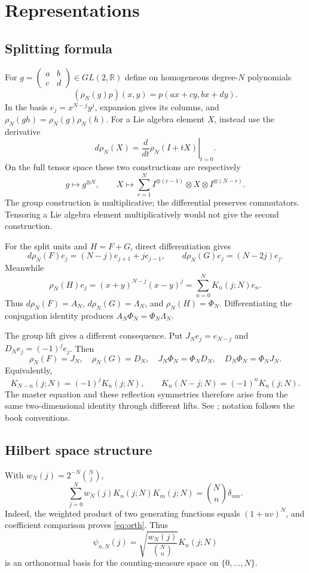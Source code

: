 \chapter{Representations}
\label{ch:8}
\section{Splitting formula}
\label{sec:8-1}
For $g=\begin{pmatrix}a&b\\c&d\end{pmatrix}\in GL(2,\mathbb R)$ define
on homogeneous degree-$N$ polynomials
\[
(\rho_N(g)p)(x,y)=p(ax+cy,bx+dy).
\]
In the basis $e_j=x^{N-j}y^j$, expansion gives its columns, and
$\rho_N(gh)=\rho_N(g)\rho_N(h)$.
For a Lie algebra element $X$, instead use the derivative
\[
d\rho_N(X)=\left.\frac{d}{dt}\rho_N(I+tX)\right|_{t=0}.
\]
On the full tensor space these two constructions are respectively
\[
g\mapsto g^{\otimes N},\qquad
X\mapsto\sum_{r=1}^N I^{\otimes(r-1)}\otimes X\otimes I^{\otimes(N-r)}.
\]
The group construction is multiplicative; the differential preserves
commutators. Tensoring a Lie algebra element multiplicatively would
not give the second construction.

For the split units and $H=F+G$, direct differentiation gives
\[
d\rho_N(F)e_j=(N-j)e_{j+1}+je_{j-1},\qquad
d\rho_N(G)e_j=(N-2j)e_j.
\]
Meanwhile
\[
\rho_N(H)e_j=(x+y)^{N-j}(x-y)^j
=\sum_{n=0}^N K_n(j;N)e_n.
\]
Thus $d\rho_N(F)=A_N$, $d\rho_N(G)=\Lambda_N$, and
$\rho_N(H)=\Phi_N$. Differentiating the conjugation identity produces
$A_N\Phi_N=\Phi_N\Lambda_N$.

The group lift gives a different consequence. Put
$J_Ne_j=e_{N-j}$ and $D_Ne_j=(-1)^je_j$. Then
\[
\rho_N(F)=J_N,\quad\rho_N(G)=D_N,\quad
J_N\Phi_N=\Phi_ND_N,\quad D_N\Phi_N=\Phi_NJ_N.
\]
Equivalently,
\[
K_{N-n}(j;N)=(-1)^jK_n(j;N),\qquad
K_n(N-j;N)=(-1)^nK_n(j;N).
\]
The master equation and these reflection symmetries therefore arise
from the same two-dimensional identity through different lifts.
See \cite[Section~7]{KocikFeynman}; notation follows the book conventions.

\section{Hilbert space structure}
\label{sec:8-2}
With $w_N(j)=2^{-N}\binom Nj$,
\begin{equation}\label{eq:orth}
\sum_{j=0}^Nw_N(j)K_n(j;N)K_m(j;N)=\binom Nn\delta_{nm}.
\end{equation}
Indeed, the weighted product of two generating functions equals $(1+uv)^N$, and coefficient comparison proves \eqref{eq:orth}. Thus
\[
\psi_{n,N}(j)=\sqrt{\frac{w_N(j)}{\binom Nn}}K_n(j;N)
\]
is an orthonormal basis for the counting-measure space on $\{0,\ldots,N\}$.


